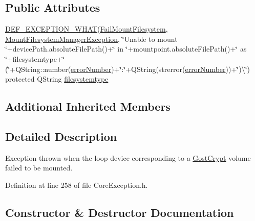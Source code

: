 \subsection*{Public Attributes}
\begin{DoxyCompactItemize}
\item 
\hyperlink{_gost_crypt_exception_8h_a5bc1e1c6c9d6f46c84eeba49e33355f9}{D\+E\+F\+\_\+\+E\+X\+C\+E\+P\+T\+I\+O\+N\+\_\+\+W\+H\+AT}(\hyperlink{class_gost_crypt_1_1_core_1_1_fail_mount_filesystem}{Fail\+Mount\+Filesystem}, \hyperlink{class_gost_crypt_1_1_core_1_1_mount_filesystem_manager_exception}{Mount\+Filesystem\+Manager\+Exception}, \char`\"{}Unable to mount \char`\"{}+device\+Path.\+absolute\+File\+Path()+\char`\"{} in \char`\"{}+mountpoint.\+absolute\+File\+Path()+\char`\"{} as \char`\"{}+filesystemtype+\char`\"{} (\char`\"{}+Q\+String\+::number(\hyperlink{class_gost_crypt_1_1_core_1_1_mount_filesystem_manager_exception_a1fb5da5dbf91cfd3e664ffb9e2aee9ee}{error\+Number})+\char`\"{}\+:\char`\"{}+Q\+String(strerror(\hyperlink{class_gost_crypt_1_1_core_1_1_mount_filesystem_manager_exception_a1fb5da5dbf91cfd3e664ffb9e2aee9ee}{error\+Number}))+\char`\"{})\textbackslash{}\char`\"{}) protected Q\+String \hyperlink{class_gost_crypt_1_1_core_1_1_fail_mount_filesystem_a73a764c0045dfdb4ad0f0229466b1fa0}{filesystemtype}
\end{DoxyCompactItemize}
\subsection*{Additional Inherited Members}


\subsection{Detailed Description}
Exception thrown when the loop device corresponding to a \hyperlink{namespace_gost_crypt}{Gost\+Crypt} volume failed to be mounted. 

Definition at line 258 of file Core\+Exception.\+h.



\subsection{Constructor \& Destructor Documentation}
\mbox{\label{class_gost_crypt_1_1_core_1_1_fail_mount_filesystem_a9558376bd8426e4e74150434c19d1a13}} 
